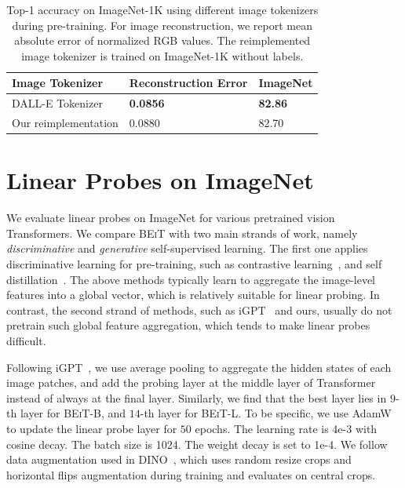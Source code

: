 \documentclass{article}
\newcommand\our{\textsc{BEiT}}
\begin{document}
\begin{table}[H]
\centering
\begin{tabular}{lll}
\toprule
\bf Image Tokenizer & \bf Reconstruction Error & \bf ImageNet\\
\midrule
DALL-E Tokenizer~\citep{dalle} & \bf 0.0856 & \bf 82.86 \\
Our reimplementation & 0.0880 & 82.70 \\
\bottomrule
\end{tabular}
\caption{
Top-1 accuracy on ImageNet-1K using different image tokenizers during pre-training. For image reconstruction, we report mean absolute error of normalized RGB values. The reimplemented image tokenizer is trained on ImageNet-1K without labels.
}
\label{tbl:image_tokenizer_ablation}
\end{table}


\section{Linear Probes on ImageNet}
\label{app:linear_prob}

We evaluate linear probes on ImageNet for various pretrained vision Transformers.
We compare \our{} with two main strands of work, namely \textit{discriminative} and \textit{generative} self-supervised learning.
The first one applies discriminative learning for pre-training, such as contrastive learning~\citep{mocov3}, and self distillation~\citep{dino}.
The above methods typically learn to aggregate the image-level features into a global vector, which is relatively suitable for linear probing.
In contrast, the second strand of methods, such as iGPT~\citep{igpt} and ours, usually do not pretrain such global feature aggregation, which tends to make linear probes difficult.

Following iGPT~\citep{igpt}, we use average pooling to aggregate the hidden states of each image patches, and add the probing layer at the middle layer of Transformer instead of always at the final layer.
Similarly, we find that the best layer lies in $9$-th layer for \our{}-B, and $14$-th layer for \our{}-L.
To be specific, we use AdamW~\citep{adamw} to update the linear probe layer for $50$ epochs. The learning rate is 4e-3 with cosine decay. The batch size is 1024. The weight decay is set to 1e-4.
We follow data augmentation used in DINO~\citep{dino}, which uses random resize crops and horizontal flips augmentation during training and evaluates on central crops.
\end{document}
